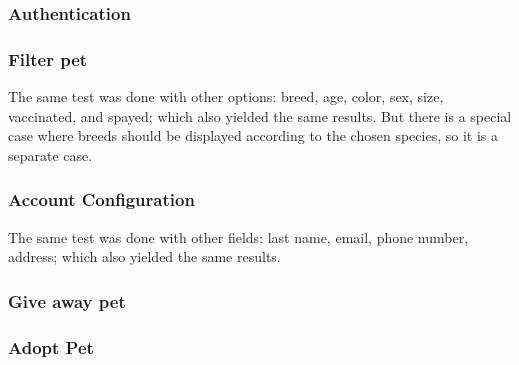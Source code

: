 \subsubsection*{Authentication}









\subsubsection*{Filter pet}



The same test was done with other options: breed, age, color, sex, size, vaccinated, and spayed; which also yielded the same results. But there is a special case where breeds should be displayed according to the chosen species, so it is a separate case.



\subsubsection*{Account Configuration}





The same test was done with other fields: last name, email, phone number, address; which also yielded the same results.

\subsubsection*{Give away pet}









\subsubsection*{Adopt Pet}

